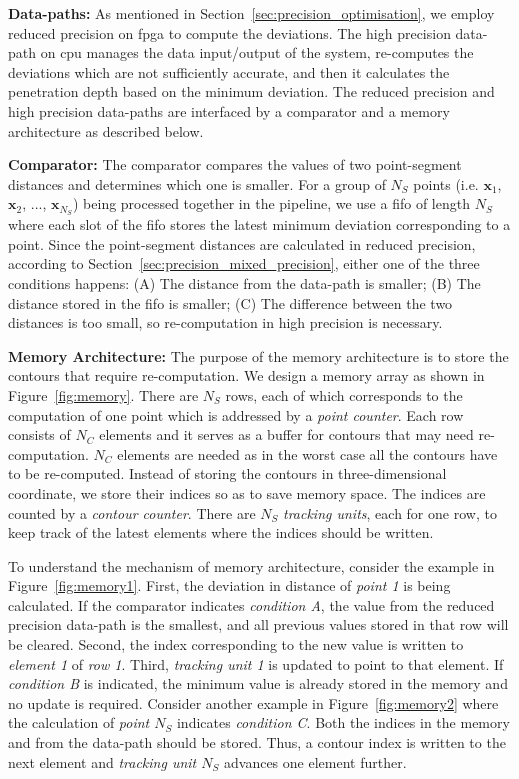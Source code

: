 \noindent \textbf{Data-paths:}
As mentioned in Section~\ref{sec:precision_optimisation}, we employ reduced precision on \gls{fpga} to compute the deviations.
The high precision data-path on \gls{cpu} manages the data input/output of the system, re-computes the deviations which are not sufficiently accurate,
and then it calculates the penetration depth based on the minimum deviation.
The reduced precision and high precision data-paths are interfaced by a comparator and a memory architecture as described below.

\noindent \textbf{Comparator:}
The comparator compares the values of two point-segment distances and determines which one is smaller.
For a group of $N_{S}$ points (i.e. $\textbf{x}_1$, $\textbf{x}_2$, ..., $\textbf{x}_{N_S}$) being processed together in the pipeline, we use a \gls{fifo} of length $N_{S}$ where
each slot of the \gls{fifo} stores the latest minimum deviation corresponding to a point.
Since the point-segment distances are calculated in reduced precision, according to Section~\ref{sec:precision_mixed_precision}, 
either one of the three conditions happens:
(A) The distance from the data-path is smaller; 
(B) The distance stored in the \gls{fifo} is smaller; 
(C) The difference between the two distances is too small, so re-computation in high precision is necessary.

\noindent \textbf{Memory Architecture:}
The purpose of the memory architecture is to store the contours that require re-computation.
We design a memory array as shown in Figure~\ref{fig:memory}.
There are $N_S$ rows, each of which corresponds to the computation of one point which is addressed by a \textit{point counter}.
Each row consists of $N_C$ elements and it serves as a buffer for contours that may need re-computation.
$N_C$ elements are needed as in the worst case all the contours have to be re-computed.
Instead of storing the contours in three-dimensional coordinate, we store their indices so as to save memory space.
The indices are counted by a \textit{contour counter}.
There are $N_S$ \textit{tracking units}, each for one row, to keep track of the latest elements where the indices should be written.

To understand the mechanism of memory architecture, consider the example in Figure~\ref{fig:memory1}.
First, the deviation in distance of \textit{point 1} is being calculated.
If the comparator indicates \emph{condition A}, the value from the reduced precision data-path is the smallest, and all previous values stored in that row will be cleared.
Second, the index corresponding to the new value is written to \textit{element 1} of \textit{row 1}.
Third, \textit{tracking unit 1} is updated to point to that element.
If \emph{condition B} is indicated, the minimum value is already stored in the memory and no update is required.
Consider another example in Figure~\ref{fig:memory2} where the calculation of \textit{point $N_S$} indicates \emph{condition C}. 
Both the indices in the memory and from the data-path should be stored.
Thus, a contour index is written to the next element and \textit{tracking unit $N_S$} advances one element further.

